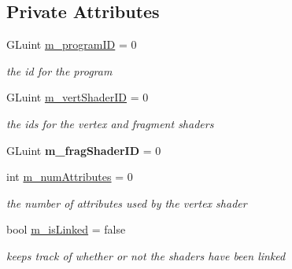 \subsection*{Private Attributes}
\begin{DoxyCompactItemize}
\item 
\mbox{\label{classnta_1_1GLSLProgram_ad1019aa2ac0a1cbdef1668870d26c3f2}} 
G\+Luint \hyperlink{classnta_1_1GLSLProgram_ad1019aa2ac0a1cbdef1668870d26c3f2}{m\+\_\+program\+ID} = 0
\begin{DoxyCompactList}\small\item\em the id for the program \end{DoxyCompactList}\item 
\mbox{\label{classnta_1_1GLSLProgram_a77478858f3885fba34a384ace272565a}} 
G\+Luint \hyperlink{classnta_1_1GLSLProgram_a77478858f3885fba34a384ace272565a}{m\+\_\+vert\+Shader\+ID} = 0
\begin{DoxyCompactList}\small\item\em the ids for the vertex and fragment shaders \end{DoxyCompactList}\item 
\mbox{\label{classnta_1_1GLSLProgram_a4762bd58f72875cdda7513684f530bed}} 
G\+Luint {\bfseries m\+\_\+frag\+Shader\+ID} = 0
\item 
\mbox{\label{classnta_1_1GLSLProgram_aa90cbc60f99bdfc69ef68633e351a118}} 
int \hyperlink{classnta_1_1GLSLProgram_aa90cbc60f99bdfc69ef68633e351a118}{m\+\_\+num\+Attributes} = 0
\begin{DoxyCompactList}\small\item\em the number of attributes used by the vertex shader \end{DoxyCompactList}\item 
\mbox{\label{classnta_1_1GLSLProgram_af133a0d5d2e15fdff99062f9ea742024}} 
bool \hyperlink{classnta_1_1GLSLProgram_af133a0d5d2e15fdff99062f9ea742024}{m\+\_\+is\+Linked} = false
\begin{DoxyCompactList}\small\item\em keeps track of whether or not the shaders have been linked \end{DoxyCompactList}\end{DoxyCompactItemize}
